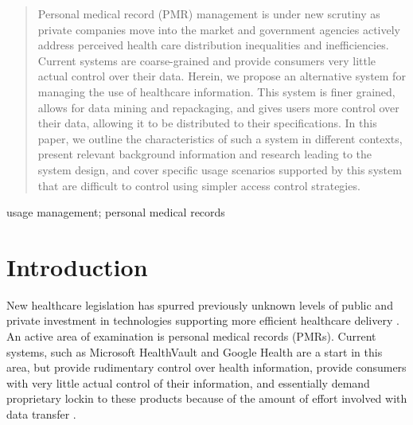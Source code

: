 \documentclass[10pt, conference, compsocconf]{IEEEtran}
\begin{document}
\begin{abstract}
Personal medical record (PMR) management is under new scrutiny as private companies move into the market and government agencies actively address perceived health care distribution inequalities and inefficiencies.  Current systems are coarse-grained and provide consumers very little actual control over their data.  Herein, we propose an alternative system for managing the use of healthcare information.  This system is finer grained, allows for data mining and repackaging, and gives users more control over their data, allowing it to be distributed to their specifications.  In this paper, we outline the characteristics of such a system in different contexts, present relevant background information and research leading to the system design, and cover specific usage scenarios supported by this system that are difficult to control using simpler access control strategies.
\end{abstract}

\begin{IEEEkeywords}
usage management; personal medical records

\end{IEEEkeywords}

%
\IEEEpeerreviewmaketitle

\section{Introduction}
New healthcare legislation has spurred previously unknown levels of public and private investment in technologies supporting more efficient healthcare delivery \cite{Emr:Web:Recovery}.   An active area of examination is personal medical records (PMRs).  Current systems, such as Microsoft HealthVault and Google Health are a start in this area, but provide rudimentary control over health information, provide consumers with very little actual control of their information, and essentially demand proprietary lockin to these products because of the amount of effort involved with data transfer \cite{Emr:EvaluationHealthInf}.
\end{document}

